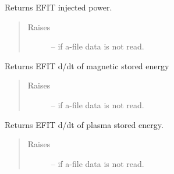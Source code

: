 \documentclass[letterpaper,10pt,english]{sphinxmanual}
\begin{document}
\begin{fulllineitems}
\begin{fulllineitems}
\begin{quote}
\begin{description}
\end{description}\end{quote}

\end{fulllineitems}


\begin{fulllineitems}
\label{eqtools:eqtools.eqdskreader.EqdskReader.getPinj}
Returns EFIT injected power.
\begin{quote}\begin{description}
\item[{Raises}] \leavevmode
{} -- 
if a-file data is not read.

\end{description}\end{quote}

\end{fulllineitems}


\begin{fulllineitems}
\label{eqtools:eqtools.eqdskreader.EqdskReader.getWbdot}
Returns EFIT d/dt of magnetic stored energy
\begin{quote}\begin{description}
\item[{Raises}] \leavevmode
{} -- 
if a-file data is not read.

\end{description}\end{quote}

\end{fulllineitems}


\begin{fulllineitems}
\label{eqtools:eqtools.eqdskreader.EqdskReader.getWpdot}
Returns EFIT d/dt of plasma stored energy.
\begin{quote}\begin{description}
\item[{Raises}] \leavevmode
{} -- 
if a-file data is not read.

\end{description}\end{quote}


\end{fulllineitems}
\end{fulllineitems}
\end{document}
